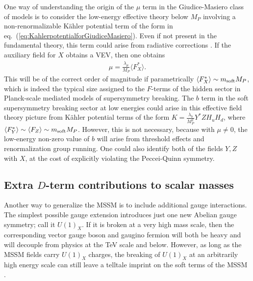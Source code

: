 \documentclass[12pt]{article}
\def\beq{\begin{eqnarray}}
\def\eeq{\end{eqnarray}}
\begin{document}
One way of understanding the origin of the $\mu$ term in the Giudice-Masiero
class of models is to consider the low-energy effective theory below $M_P$
involving a non-renormalizable K\"ahler potential term of the form in
eq.~(\ref{eq:KahlerpotentialforGiudiceMasiero}). Even if not present in
the fundamental theory, this term could arise from radiative corrections
\cite{HallLykkenWeinberg}. If
the auxiliary field for $X$ obtains a VEV, then one obtains \beq
\mu = \frac{\lambda_\mu}{M_P} \langle F_X^* \rangle .
\eeq
This will be of the correct order of magnitude if parametrically
$\langle F_X^* \rangle \sim m_{\rm soft} M_P$, which is indeed the typical
size
assigned to the $F$-terms of the hidden sector in Planck-scale mediated
models of supersymmetry breaking. The
$b$ term in the soft supersymmetry breaking sector at low energies could
arise in this effective field theory picture from K\"ahler potential terms of
the form $K = \frac{\lambda_b}{M_P^2} Y^* Z H_u H_d$, where $\langle F_Y^*
\rangle \sim \langle F_Z \rangle \sim m_{\rm soft} M_P$. 
However, this is not necessary, because with $\mu
\not= 0$, the low-energy non-zero value of $b$ will arise from
threshold effects and renormalization group running.
One
could also identify both of the fields $Y,Z$ with $X$, at the cost of explicitly violating
the Peccei-Quinn symmetry.

\subsection{Extra $D$-term contributions to scalar 
masses}\label{subsec:variations.Dterms}
\setcounter{equation}{0}

Another way to generalize the MSSM is to include additional gauge
interactions. The simplest possible gauge extension introduces just one
new Abelian gauge symmetry; call it $U(1)_X$. If it is broken at a very
high mass scale, then the corresponding vector gauge boson and gaugino
fermion will both be heavy and will decouple from physics at the TeV scale
and below. However, as long as the MSSM fields carry $U(1)_X$ charges, the
breaking of $U(1)_X$ at an arbitrarily high energy scale can still leave a
telltale imprint on the soft terms of the MSSM \cite{Dterms}. 
\end{document}
